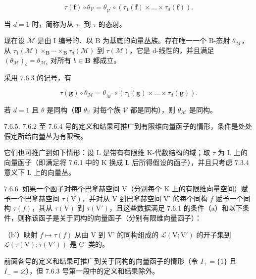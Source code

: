 \[
\tau (\mathbf {f}) \circ \theta_ {\mathcal{V}} = \theta_ {\mathcal{V}^{\prime}} \circ (\tau_ {1} (\mathbf {f}) \times \dots \times \tau _{d} (\mathbf {f})).
\]

当 \(d = 1\) 时，简称为从 \(\tau_1\) 到 \(\tau\) 的态射。

现在设 \(\mathcal{M}\) 是由 I 编号的、以 B 为基底的向量丛族。存在唯一一个 B-态射 \(\theta_{\mathcal{M}}\)，从 \(\tau_{1}(\mathcal{M}) \times_{\mathbf{B}} \cdots \times_{\mathbf{B}} \tau_{d}(\mathcal{M})\) 到 \(\tau(\mathcal{M})\)，它是 d-线性的，并且满足 \((\theta_{\mathcal{M}})_{b} = \theta_{\mathcal{M}_{b}}\) 对所有 \(b \in \mathbf{B}\) 都成立。

采用 7.6.3 的记号，有

\[
\tau (\mathbf {g}) \circ \theta_ {\mathcal {M}} = \theta_ {\mathcal {M} ^ {\prime}} \circ (\tau_ {1} (\mathbf {g}) \times \dots \times \tau_ {d} (\mathbf {g})).
\]

若 \(d=1\) 且 \(\theta\) 是同构（即 \(\theta_{\mathcal{V}}\) 对每个族 \(\mathcal{V}\) 都是同构），则 \(\theta_{\mathcal{M}}\) 是同构。

7.6.5. 7.6.2 至 7.6.4 号的定义和结果可推广到有限维向量函子的情形，条件是处处假定所给向量丛为有限秩。

它们也可推广到如下情形：设 L 是带有有限维 K-代数结构的域；取 \(\tau\) 为 L 上的向量函子（即满足将 7.6.1 中的 K 换成 L 后所得假设的函子），并且只考虑 7.3.4 意义下 L 上的向量丛。

7.6.6. 如果一个函子对每个巴拿赫空间 V（分别每个 K 上的有限维向量空间）赋予一个巴拿赫空间 \(\tau(\mathrm{V})\)，并对从 V 到巴拿赫空间 V' 的每个同构 \(f\) 赋予一个同构 \(\tau(f)\)，其从 \(\tau(\mathrm{V})\) 到 \(\tau(\mathrm{V}')\)，且这些数据满足 7.6.1 的条件（a）和以下条件，则称该函子是关于同构的向量函子（分别有限维向量函子）：

（b'）映射 \(f\mapsto\tau(f)\) 从由 V 到 V' 的同构组成的 \(\mathcal{L}(\mathrm{V};\mathrm{V}')\) 的开子集到 \(\mathcal{L}(\tau(\mathrm{V});\tau(\mathrm{V}'))\) 是 C' 类的。

前面各号的定义和结果可推广到关于同构的向量函子的情形（令 \(I_{+} = \{1\}\) 且 \(I_{-} = \varnothing\)），但 7.6.3 号第一段中的定义和结果除外。

